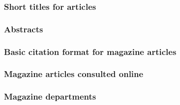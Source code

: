 \documentclass[11pt,letterpaper,oneside]{article}
\begin{document}
\begin{citebib}
\item \cite[414]{sewall1896}
\item \cite{moraes1950}
\end{citebib}

\subsubsection{Short titles for articles}

\begin{citebib}
\item \cite[223]{rosenblum2015}
\item \cite[225]{rosenblum2015}
\end{citebib}

\subsubsection{Abstracts}

\begin{citebib}
\item \cite{matute2015}
\end{citebib}

\setcounter{subsubsection}{187}
\subsubsection{Basic citation format for magazine articles}

\begin{citebib}
\item \cite[48]{saulnier2008}
\item \cite[59]{lepore2015}
\end{citebib}

\subsubsection{Magazine articles consulted online}

\begin{citebib}
\item \cite{vick2015}
\item \cite[5]{hanemann1926}
\end{citebib}

\subsubsection{Magazine departments}
\end{document}
